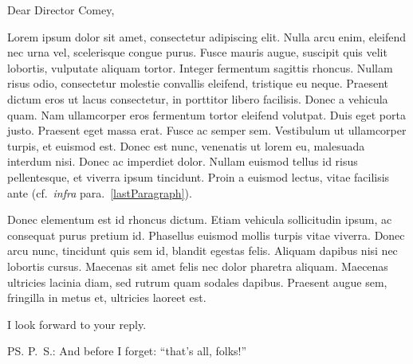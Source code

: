 \documentclass[a4paper,12pt,dvipsnames*]{letter}
\begin{document}
\begin{letter}{\recipient}

\opening{Dear Director Comey,}


\pn Lorem ipsum dolor sit amet, consectetur adipiscing elit. Nulla arcu enim, eleifend nec urna vel, scelerisque congue purus. Fusce mauris augue, suscipit quis velit lobortis, vulputate aliquam tortor. Integer fermentum sagittis rhoncus. Nullam risus odio, consectetur molestie convallis eleifend, tristique eu neque. Praesent dictum eros ut lacus consectetur, in porttitor libero facilisis. Donec a vehicula quam. Nam ullamcorper eros fermentum tortor eleifend volutpat. Duis eget porta justo. Praesent eget massa erat. Fusce ac semper sem. Vestibulum ut ullamcorper turpis, et euismod est. Donec est nunc, venenatis ut lorem eu, malesuada interdum nisi. Donec ac imperdiet dolor. Nullam euismod tellus id risus pellentesque, et viverra ipsum tincidunt. Proin a euismod lectus, vitae facilisis ante (cf.\ \emph{infra} para.~\ref{lastParagraph}).

\pn Donec elementum est id rhoncus dictum. Etiam vehicula sollicitudin ipsum, ac consequat purus pretium id. Phasellus euismod mollis turpis vitae viverra. Donec arcu nunc, tincidunt quis sem id, blandit egestas felis. Aliquam dapibus nisi nec lobortis cursus. Maecenas sit amet felis nec dolor pharetra aliquam. Maecenas ultricies lacinia diam, sed rutrum quam sodales dapibus. Praesent augue sem, fringilla in metus et, ultricies laoreet est. \label{lastParagraph}

I look forward to your reply.

\theend


\vspace{1.5em}
\ps{P.\ S.: And before I forget: ``that's all, folks!''}

\end{letter}
\end{document}
